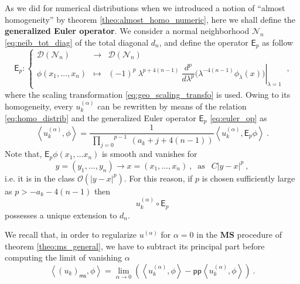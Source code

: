 \documentclass[11pt]{book}
\newcommand{\pp}{\mathsf{pp}}
\newcommand{\ms}{\mathsf{ms}}
\newcommand{\MS}{\textbf{MS}}
\newcommand{\sm}[1]{\left\langle#1\right\rangle}
\newcommand{\Dcal}{\mathcal{D}}
\newcommand{\Ncal}{\mathcal{N}}
\newcommand{\Ocal}{\mathcal{O}}
\newcommand{\Esf}{\mathsf{E}}
\theoremstyle{break}
\begin{document}
As we did for numerical distributions when we introduced a notion of ``almost homogeneity'' by theorem \ref{theo:almost_homo_numeric}, here we shall define the \textbf{generalized Euler operator}\index{$\Esf_p$}. We consider a normal neighborhood $\Ncal_n$ \eqref{eq:neib_tot_diag} of the total diagonal $d_n$, and define the operator $\Esf_p$ as follow
%
\begin{equation}
\Esf_p : \left\{
\begin{array}{lcl}
\Dcal(\Ncal_n) & \to & \Dcal(\Ncal_n) \\
\phi(x_1,\dots, x_n) & \mapsto & \left. (-1)^p \ \lambda^{p+4(n-1)} \ \dfrac{d^p}{d\lambda^p} \bigg( \lambda^{-4(n-1)}  \phi_\lambda(x) \bigg) \right|_{\lambda = 1}
\end{array}
\right. \ ,
\label{eq:euler_op}
%
\end{equation}
%
where the scaling transformation \eqref{eq:geo_scaling_transfo} is used. Owing to its homogeneity, every $u^{(\alpha)}_k$ can be rewritten by means of the relation \eqref{eq:homo_distrib} and the generalized Euler operator $\Esf_p$ \eqref{eq:euler_op} as
%
\begin{equation}
\sm{ u^{(\alpha)}_k, \phi } = \frac{1}{\overset{p-1}{\ \underset{j=0}{\prod}} \ (a_k+j+4(n-1))}   \sm{ u^{(\alpha)}_k, \Esf_p \phi } \ .
\label{eq:expose_poles}
\end{equation}
%
Note that, $\Esf_p \phi(x_1, \dots x_n)$ is smooth and vanishes for
%
\begin{equation*}
y = (y_1 , \dots , y_n) \to x = (x_1, \dots , x_n) \ , \ \mbox{ as } \ \ C|y-x|^p \ , 
\end{equation*}
%
i.e. it is in the class $\Ocal(|y-x|^{p})$. For this reason, if  $p$ is chosen sufficiently large as $p > -a_k-4(n-1)$ then 
\begin{equation*}
u^{(\alpha)}_k \circ \Esf_p 
\end{equation*}
%
possesses a unique extension to $d_n$. 


\bigskip


We recall that, in order to regularize $u^{(\alpha)}$ for $\alpha=0$ in the $\MS$ procedure of theorem \ref{theo:ms_general}, we have to subtract its principal part before computing the limit of vanishing $\alpha$
%
\begin{equation*}
\sm{ (u_k)_\ms, \phi } = \lim_{\alpha \to 0} \left( \sm{ u^{(\alpha)}_k, \phi } - \pp\sm{ u^{(\alpha)}_k , \phi } \right) \ .
\end{equation*}
\end{document}
